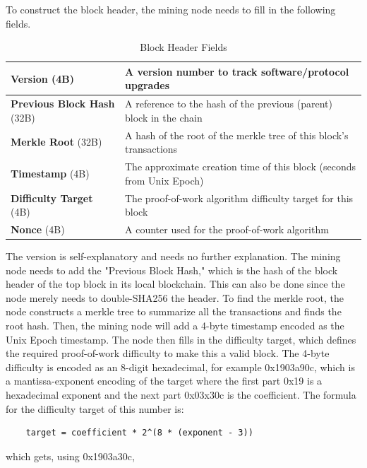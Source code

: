 \documentclass{article}
\begin{document}
    To construct the block header, the mining node needs to fill in the following fields.

    \begin{table}[H]
    \centering
    \begin{tabular}{|p{}|p{}|}
    \hline
    \textbf{Version} (4B) & A version number to track software/protocol upgrades \\
    \hline
    \textbf{Previous Block Hash} (32B) & A reference to the hash of the previous (parent) block in the chain \\
    \hline
    \textbf{Merkle Root} (32B) & A hash of the root of the merkle tree of this block's transactions \\
    \hline
    \textbf{Timestamp} (4B) & The approximate creation time of this block (seconds from Unix Epoch) \\
    \hline
    \textbf{Difficulty Target} (4B) & The proof-of-work algorithm difficulty target for this block \\
    \hline
    \textbf{Nonce} (4B) & A counter used for the proof-of-work algorithm \\
    \hline
    \end{tabular}
    \caption{Block Header Fields}
    \end{table}

    The version is self-explanatory and needs no further explanation. The mining node needs to add the "Previous Block Hash," which is the hash of the block header of the top block in its local blockchain. This can also be done since the node merely needs to double-SHA256 the header. To find the merkle root, the node constructs a merkle tree to summarize all the transactions and finds the root hash. Then, the mining node will add a 4-byte timestamp encoded as the Unix Epoch timestamp. The node then fills in the difficulty target, which defines the required proof-of-work difficulty to make this a valid block. The 4-byte difficulty is encoded as an 8-digit hexadecimal, for example 0x1903a90c, which is a mantissa-exponent encoding of the target where the first part 0x19 is a hexadecimal exponent and the next part 0x03x30c is the coefficient. The formula for the difficulty target of this number is:

    \begin{lstlisting}
    target = coefficient * 2^(8 * (exponent - 3))
    \end{lstlisting}

    which gets, using 0x1903a30c,
\end{document}
